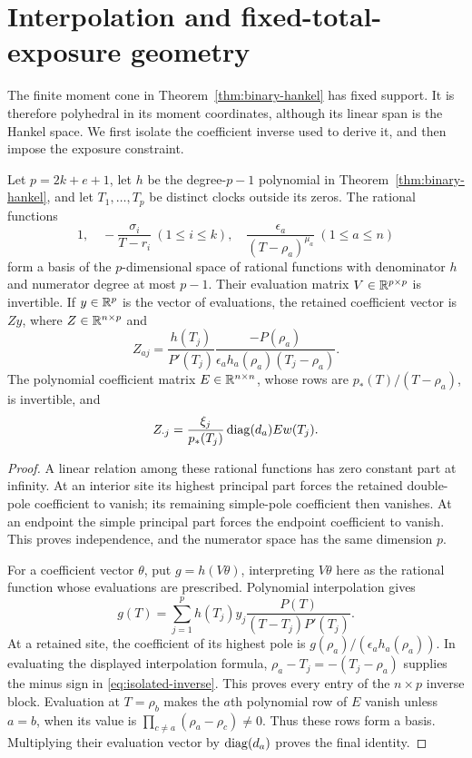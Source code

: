 \section{Interpolation and fixed-total-exposure geometry}\label{sec:design}
The finite moment cone in Theorem~\ref{thm:binary-hankel} has fixed support. It is therefore polyhedral in its moment coordinates, although its linear span is the Hankel space. We first isolate the coefficient inverse used to derive it, and then impose the exposure constraint.

\begin{lemma}\label{lem:rational-inverse}
Let $p=2k+e+1$, let $h$ be the degree-$p-1$ polynomial in Theorem~\ref{thm:binary-hankel}, and let $T_1,\ldots,T_p$ be distinct clocks outside its zeros. The rational functions
\[
 1,\quad -\frac{\sigma_i}{T-r_i}\ (1\le i\le k),\quad
 \frac{\epsilon_a}{(T-\rho_a)^{\mu_a}}\ (1\le a\le n)
\]
form a basis of the $p$-dimensional space of rational functions with denominator $h$ and numerator degree at most $p-1$. Their evaluation matrix $V\in\mathbb R^{p\times p}$ is invertible. If $y\in\mathbb R^p$ is the vector of evaluations, the retained coefficient vector is $Zy$, where $Z\in\mathbb R^{n\times p}$ and
\begin{equation}\label{eq:isolated-inverse}
 Z_{aj}=\frac{h(T_j)}{P'(T_j)}
 \frac{-P(\rho_a)}{\epsilon_a h_a(\rho_a)(T_j-\rho_a)}.
\end{equation}
The polynomial coefficient matrix $E\in\mathbb R^{n\times n}$, whose rows are $p_*(T)/(T-\rho_a)$, is invertible, and
\[
 Z_{\cdot j}=\frac{\xi_j}{p_*(T_j)}\operatorname{diag}(d_a)Ew(T_j).
\]
\end{lemma}
\begin{proof}
A linear relation among these rational functions has zero constant part at infinity. At an interior site its highest principal part forces the retained double-pole coefficient to vanish; its remaining simple-pole coefficient then vanishes. At an endpoint the simple principal part forces the endpoint coefficient to vanish. This proves independence, and the numerator space has the same dimension $p$.

For a coefficient vector $\theta$, put $g=h(V\theta)$, interpreting $V\theta$ here as the rational function whose evaluations are prescribed. Polynomial interpolation gives
\[
 g(T)=\sum_{j=1}^p h(T_j)y_j\frac{P(T)}{(T-T_j)P'(T_j)}.
\]
At a retained site, the coefficient of its highest pole is $g(\rho_a)/(\epsilon_a h_a(\rho_a))$. In evaluating the displayed interpolation formula, $\rho_a-T_j=-(T_j-\rho_a)$ supplies the minus sign in \eqref{eq:isolated-inverse}. This proves every entry of the $n\times p$ inverse block. Evaluation at $T=\rho_b$ makes the $a$th polynomial row of $E$ vanish unless $a=b$, when its value is $\prod_{c\ne a}(\rho_a-\rho_c)\ne0$. Thus these rows form a basis. Multiplying their evaluation vector by $\operatorname{diag}(d_a)$ proves the final identity.
\end{proof}

